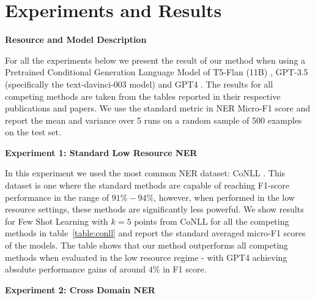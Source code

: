 \documentclass[11pt]{article}
\begin{document}
\section{Experiments and Results}

\noindent\textbf{Resource and Model Description}

For all the experiments below we present the result of our method when using a Pretrained Conditional Generation Language Model of T5-Flan (11B) \citep{chung2022scaling}, GPT-3.5 
 \citep{brown2020language} (specifically the text-davinci-003 model) and GPT4 \citep{openai2023gpt4}. The results for all competing methods are taken from the tables reported in their respective publications and papers. We use the standard metric in NER \citep{de2015survey, wang2022deepstruct} Micro-F1 score and report the mean and variance over 5 runs on a random sample of 500 examples on the test set.

\noindent\textbf{Experiment 1: Standard Low Resource NER}

In this experiment we used the most common NER dataset: CoNLL \citep{sang2003introduction}. This dataset is one where the standard methods are capable of reaching F1-score performance in the range of $91\%-94\%$, \citep{wang2022deepstruct} however, when performed in the low resource settings, these methods are significantly less powerful. We show results for Few Shot Learning with $k=5$ points from CoNLL for all the competing methods in table~\ref{table:conll} and report the standard averaged micro-F1 scores of the models. The table shows that our method outperforms all competing methods when evaluated in the low resource regime - with GPT4 achieving absolute performance gains of around $4\%$ in F1 score. 

\noindent\textbf{Experiment 2: Cross Domain NER} 
\end{document}

